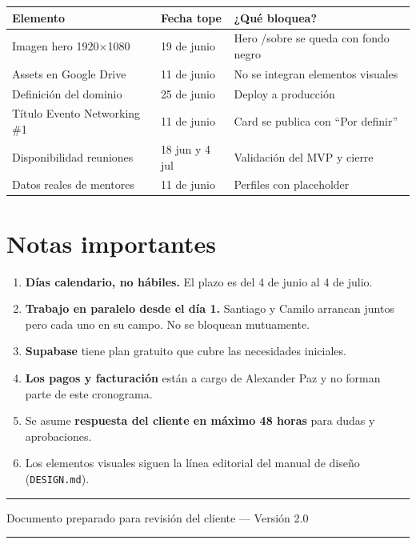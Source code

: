 \documentclass[11pt]{article}
\begin{document}
\begin{table}[h]
  \centering
  \small
  \renewcommand{\arraystretch}{1.2}
  \begin{tabular}{L{5cm} C{3cm} L{6cm}}
    \toprule
    {\color{op-white}\bfseries Elemento} &
    {\color{op-white}\bfseries Fecha tope} &
    {\color{op-white}\bfseries ¿Qué bloquea?} \\
    \midrule
    Imagen hero 1920×1080 &
    19 de junio &
    Hero /sobre se queda con fondo negro \\
    Assets en Google Drive &
    11 de junio &
    No se integran elementos visuales \\
    Definición del dominio &
    25 de junio &
    Deploy a producción \\
    Título Evento Networking \#1 &
    11 de junio &
    Card se publica con ``Por definir'' \\
    Disponibilidad reuniones &
    18 jun y 4 jul &
    Validación del MVP y cierre \\
    Datos reales de mentores &
    11 de junio &
    Perfiles con placeholder \\
    \bottomrule
  \end{tabular}
\end{table}

\section{Notas importantes}

\medskip

\begin{enumerate}
  \item \textbf{Días calendario, no hábiles.} El plazo es del 4 de junio al 4 de julio.
  \item \textbf{Trabajo en paralelo desde el día 1.} Santiago y Camilo arrancan juntos pero cada uno en su campo. No se bloquean mutuamente.
  \item \textbf{Supabase} tiene plan gratuito que cubre las necesidades iniciales.
  \item \textbf{Los pagos y facturación} están a cargo de Alexander Paz y no forman parte de este cronograma.
  \item Se asume \textbf{respuesta del cliente en máximo 48 horas} para dudas y aprobaciones.
  \item Los elementos visuales siguen la línea editorial del manual de diseño (\texttt{DESIGN.md}).
\end{enumerate}

\vspace{1.5cm}

\begin{center}
  {\color{op-verde}\rule{0.2\textwidth}{0.3mm}}
  \hspace{1.5em}
  {\color{op-textmuted}\footnotesize Documento preparado para revisión del cliente --- Versión 2.0}
  \hspace{1.5em}
  {\color{op-rosa}\rule{0.2\textwidth}{0.3mm}}
\end{center}
\end{document}
